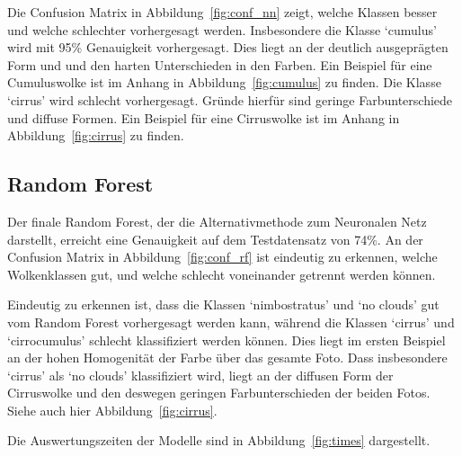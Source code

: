 Die Confusion Matrix in Abbildung~\ref{fig:conf_nn} zeigt, welche Klassen besser und
welche schlechter vorhergesagt werden.
Insbesondere die Klasse `cumulus' wird mit 95\% Genauigkeit vorhergesagt.
Dies liegt an der deutlich ausgeprägten Form und und den harten Unterschieden in den Farben.
Ein Beispiel für eine Cumuluswolke ist im Anhang in Abbildung~\ref{fig:cumulus} zu finden.
Die Klasse `cirrus' wird schlecht vorhergesagt.
Gründe hierfür sind geringe Farbunterschiede und diffuse Formen.
Ein Beispiel für eine Cirruswolke ist im Anhang in Abbildung~\ref{fig:cirrus} zu finden.


\hypertarget{random-forest-1}{%
\subsection{Random Forest}\label{random-forest-1}}

Der finale Random Forest, der die Alternativmethode zum Neuronalen Netz
darstellt, erreicht eine Genauigkeit auf dem Testdatensatz von 74\%.
An der Confusion Matrix in Abbildung~\ref{fig:conf_rf} ist eindeutig zu erkennen, welche
Wolkenklassen gut, und welche schlecht voneinander getrennt werden
können.

Eindeutig zu erkennen ist, dass die Klassen `nimbostratus' und `no clouds' gut
vom Random Forest vorhergesagt werden kann, während die Klassen
`cirrus' und `cirrocumulus' schlecht klassifiziert werden
können.
Dies liegt im ersten Beispiel an der hohen Homogenität der Farbe über das gesamte Foto.
Dass insbesondere `cirrus' als `no clouds' klassifiziert wird,
liegt an der diffusen Form der Cirruswolke und den deswegen geringen Farbunterschieden der beiden
Fotos.
Siehe auch hier Abbildung~\ref{fig:cirrus}.

Die Auswertungszeiten der Modelle sind in Abbildung~\ref{fig:times} dargestellt.

